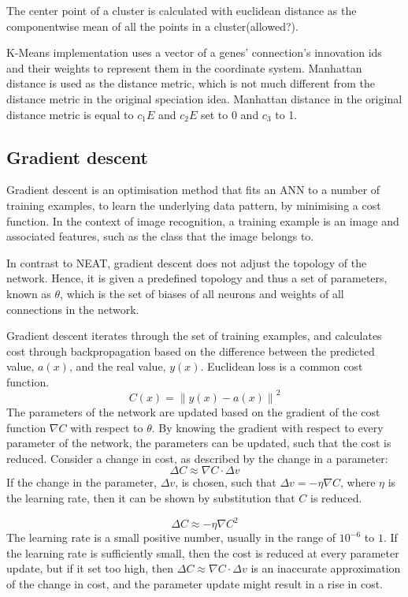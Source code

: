 The center point of a cluster is calculated with euclidean distance as the componentwise mean of all the points in a cluster(allowed?).

K-Means implementation uses a vector of a genes' connection's innovation ids and their weights to represent them in the coordinate system. Manhattan distance is used as the distance metric, which is not much different from the distance metric in the original speciation idea. Manhattan distance in the original distance metric is equal to ${c_1E}$ and ${c_2E}$ set to 0 and $c_3$ to 1.


\subsection{Gradient descent}
Gradient descent is an optimisation method that fits an ANN to a number of training examples, to learn the underlying data pattern, by minimising a cost function. In the context of image recognition, a training example is an image and associated features, such as the class that the image belongs to.

In contrast to NEAT, gradient descent does not adjust the topology of the network. Hence, it is given a predefined topology and thus a set of parameters, known as $\theta$, which is the set of biases of all neurons and weights of all connections in the network. 

Gradient descent iterates through the set of training examples, and calculates cost through backpropagation based on the difference between the predicted value, $a(x)$, and the real value, $y(x)$. Euclidean loss is a common cost function.
$$C(x) = {\lVert y(x) - a(x) \rVert}^2$$
The parameters of the network are updated based on the gradient of the cost function $\nabla C$ with respect to $\theta$. By knowing the gradient with respect to every parameter of the network, the parameters can be updated, such that the cost is reduced. Consider a change in cost, as described by the change in a parameter:
$$\Delta C \approx \nabla C \cdot \Delta v $$
If the change in the parameter, $\Delta v$, is chosen, such that $\Delta v = - \eta \nabla C$, where $\eta$ is the learning rate, then it can be shown by substitution that $C$ is reduced.

$$\Delta C \approx - \eta {\nabla C}^2 $$
The learning rate is a small positive number, usually in the range of $10^{-6}$ to $1$. If the learning rate is sufficiently small, then the cost is reduced at every parameter update, but if it set too high, then $\Delta C \approx \nabla C \cdot \Delta v $ is an inaccurate approximation of the change in cost, and the parameter update might result in a rise in cost. \newline


